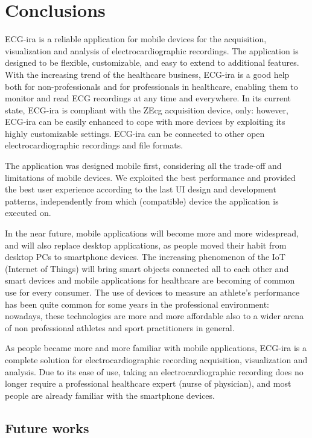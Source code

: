 
\chapter{Conclusions}\label{Chapter11}

ECG-ira is a reliable application for mobile devices for the acquisition, visualization and analysis of electrocardiographic recordings. The application is designed to be flexible, customizable, and easy to extend to additional features. With the increasing trend of the healthcare business, ECG-ira is a good help both for non-professionals and for professionals in healthcare, enabling them to monitor and read ECG recordings at any time and everywhere. In its current state, ECG-ira is compliant with the ZEcg acquisition device, only: however, ECG-ira can be easily enhanced to cope with more devices by exploiting its highly customizable settings. ECG-ira can be connected to other open electrocardiographic recordings and file formats.

The application was designed mobile first, considering all the trade-off and limitations of mobile devices. We exploited the best performance and provided the best user experience according to the last UI design and development patterns, independently from which (compatible) device the application is executed on.

In the near future, mobile applications will become more and more widespread, and will also replace desktop applications, as people moved their habit from desktop PCs to smartphone devices. The increasing phenomenon of the IoT (Internet of Things) will bring smart objects connected all to each other and smart devices and mobile applications for healthcare are becoming of common use for every consumer. The use of devices to measure an athlete's performance has been quite common for some years in the professional environment: nowadays, these technologies are more and more affordable also to a wider arena of non professional athletes and sport practitioners in general.

As people became more and more familiar with mobile applications, ECG-ira is a complete solution for electrocardiographic recording acquisition, visualization and analysis. Due to its ease of use, taking an electrocardiographic recording does no longer require a professional healthcare expert (nurse of physician), and most people are already familiar with the smartphone devices.


\section{Future works}


